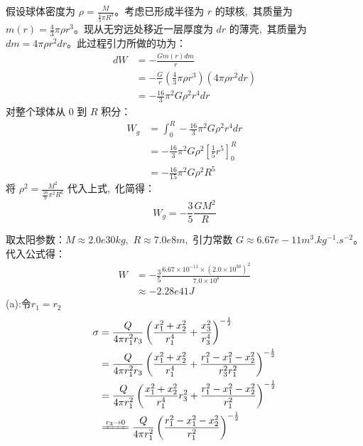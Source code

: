 假设球体密度为 $\rho = \frac{M}{\frac{4}{3}\pi R^3}$。考虑已形成半径为 $r$ 的球核, \,其质量为 $m(r) = \frac{4}{3}\pi \rho r^3$。现从无穷远处移近一层厚度为 $dr$ 的薄壳, \,其质量为 $dm = 4\pi \rho r^2 dr$。此过程引力所做的功为：
\begin{align}
    dW &= -\frac{G m(r) dm}{r} \\
       &= -\frac{G}{r} \left( \frac{4}{3}\pi \rho r^3 \right) \left( 4\pi \rho r^2 dr \right) \\
       &= -\frac{16}{3} \pi^2 G \rho^2 r^4 dr
\end{align}
对整个球体从 $0$ 到 $R$ 积分：
\begin{align}
    W_g &= \int_{0}^{R} -\frac{16}{3} \pi^2 G \rho^2 r^4 dr \\
        &= -\frac{16}{3} \pi^2 G \rho^2 \left[ \frac{1}{5} r^5 \right]_{0}^{R} \\
        &= -\frac{16}{15} \pi^2 G \rho^2 R^5
\end{align}
将 $\rho^2 = \frac{M^2}{\frac{16}{9}\pi^2 R^6}$ 代入上式, \,化简得：
\begin{equation}
    W_g = -\frac{3}{5} \frac{GM^2}{R}
\end{equation}

取太阳参数：$M \approx {2.0e30}{kg}$, \,$R \approx {7.0e8}{m}$, \,引力常数 $G \approx {6.67e-11}{m^3.kg^{-1}.s^{-2}}$。代入公式得：
\begin{align*}
    W &= -\frac{3}{5} \frac{6.67 \times 10^{-11} \times (2.0 \times 10^{30})^2}{7.0 \times 10^8} \\
            &\approx -{2.28e41}{J}
\end{align*}
(a):令$r_1=r_2$
\begin{align*}
    \sigma&=\dfrac{Q}{4\pi r_1^2r_3}\left(\dfrac{x_1^2+x_2^2}{r_1^4}+\dfrac{x_3^2}{r_3^4}\right)^{-\frac{1}{2}}\\
    &=\dfrac{Q}{4\pi r_1^2r_3}\left(\dfrac{x_1^2+x_2^2}{r_1^4}+\dfrac{r_1^2-{x_1^2-x_2^2}}{r_3^2r_1^2}\right)^{-\frac{1}{2}}\\
    &=\dfrac{Q}{4\pi r_1^2}\left(\dfrac{x_1^2+x_2^2}{r_1^4}r_3^2+\dfrac{r_1^2-{x_1^2-x_2^2}}{r_1^2}\right)^{-\frac{1}{2}}\\
    &\xlongequal{r_3\rightarrow 0}\dfrac{Q}{4\pi r_1^2}\left(\dfrac{r_1^2-{x_1^2-x_2^2}}{r_1^2}\right)^{-\frac{1}{2}}
\end{align*}

